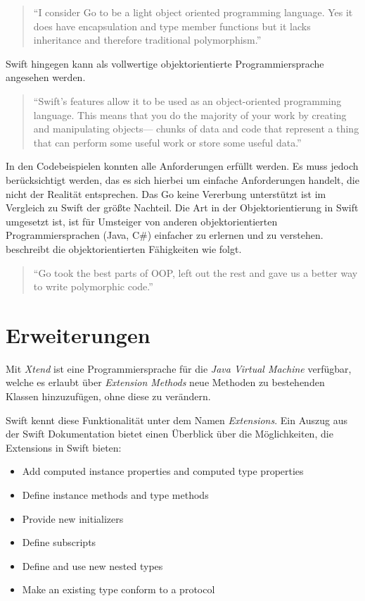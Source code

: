 \begin{quote}
\enquote{I consider Go to be a light object oriented programming language. Yes it does have encapsulation and type member functions but it lacks inheritance and therefore traditional polymorphism.} \cite[]{WilliamKennedy.2013}
\end{quote}

Swift hingegen kann als vollwertige objektorientierte Programmiersprache angesehen werden.

\begin{quote}
\enquote{Swift’s features allow it to be used as an object-oriented programming language. This
means that you do the majority of your work by creating and manipulating objects—
chunks of data and code that represent a thing that can perform some useful work or
store some useful data.} \cite[59]{Manning.2016}
\end{quote}

In den Codebeispielen konnten alle Anforderungen erfüllt werden.
Es muss jedoch berücksichtigt werden, das es sich hierbei um einfache Anforderungen handelt, die nicht der Realität entsprechen. 
Das Go keine Vererbung unterstützt ist im Vergleich zu Swift der größte Nachteil.
Die Art in der Objektorientierung in Swift umgesetzt ist, ist für Umsteiger von anderen objektorientierten Programmiersprachen (Java, C\#) einfacher zu erlernen und zu verstehen.
\cite[]{WilliamKennedy.2013} beschreibt die objektorientierten Fähigkeiten wie folgt.

\begin{quote}
\enquote{Go took the best parts of OOP, left out the rest and gave us a better way to write polymorphic code.} \cite[]{WilliamKennedy.2013}
\end{quote}

\section{Erweiterungen}
Mit \textit{Xtend}\cite[]{Xtend} ist eine Programmiersprache für die \textit{Java Virtual Machine} verfügbar, welche es erlaubt über \textit{Extension Methods} neue Methoden zu bestehenden Klassen hinzuzufügen, ohne diese zu verändern.

Swift kennt diese Funktionalität unter dem Namen \textit{Extensions}.
Ein Auszug aus der Swift Dokumentation \cite[S331]{Apple.2017} bietet einen Überblick über die Möglichkeiten, die Extensions in Swift bieten:

\begin{itemize}
    \item Add computed instance properties and computed type properties    
    \item Define instance methods and type methods
    \item Provide new initializers
    \item Define subscripts
    \item Define and use new nested types
    \item Make an existing type conform to a protocol
\end{itemize}

